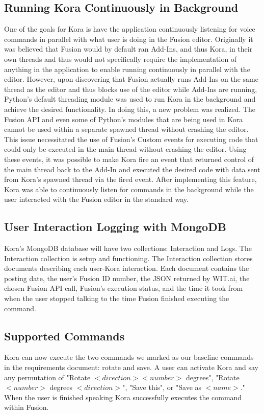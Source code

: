 \documentclass[onecolumn, draftclsnofoot,10pt, compsoc]{IEEEtran}
\begin{document}
    \subsection{Running Kora Continuously in Background}
    One of the goals for Kora is have the application continuously listening for voice commands in parallel with what user is doing in the Fusion editor.
    Originally it was believed that Fusion would by default ran Add-Ins, and thus Kora, in their own threads and thus would not specifically require the implementation of anything in the application to enable running continuously in parallel with the editor.
    However, upon discovering that Fusion actually runs Add-Ins on the same thread as the editor and thus blocks use of the editor while Add-Ins are running, Python’s default threading module was used to run Kora in the background and achieve the desired functionality.
    In doing this, a new problem was realized.
    The Fusion API and even some of Python’s modules that are being used in Kora cannot be used within a separate spawned thread without crashing the editor.
    This issue necessitated the use of Fusion’s Custom events for executing code that could only be executed in the main thread without crashing the editor.
    Using these events, it was possible to make Kora fire an event that returned control of the main thread back to the Add-In and executed the desired code with data sent from Kora’s spawned thread via the fired event.
    After implementing this feature, Kora was able to continuously listen for commands in the background while the user interacted with the Fusion editor in the standard way.

    \subsection{User Interaction Logging with MongoDB}
	Kora's MongoDB database will have two collections: Interaction and Logs.
	The Interaction collection is setup and functioning.
	The Interaction collection stores documents describing each user-Kora interaction.
	Each document contains the posting date, the user's Fusion ID number, the JSON returned by WIT.ai, the chosen Fusion API call, Fusion's execution status, and the time it took from when the user stopped talking to the time Fusion finished executing the command.
	
    \subsection{Supported Commands}
	Kora can now execute the two commands we marked as our baseline commands in the requirements document: rotate and save.
	A user can activate Kora and say any permutation of "Rotate $<direction> <number>$ degrees", "Rotate $<number>$ degrees $<direction>$", "Save this", or "Save as $<name>$."
	When the user is finished speaking Kora successfully executes the command within Fusion.
	
\end{document}
